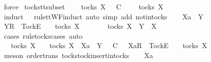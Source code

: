 \begin{isabellebody}
\ force\isanewline
{}\isamarkupfalse%
%
\endisatagproof
{\isafoldproof}%
%
\isadelimproof
\isanewline
%
\endisadelimproof
\isanewline
{}\isamarkupfalse%
\ tocks{\isacharunderscore}tt{\isacharunderscore}subset{}{\isacharcolon}\isanewline
\ \ {\isachardoublequoteopen}{\isasymsigma}\ {\isasymin}\ tocks\ X\ {\isasymLongrightarrow}\ {\isasymrho}\ {\isasymsubseteq}\isactrlsub C\ {\isasymsigma}\ {\isasymLongrightarrow}\ {\isasymrho}\ {\isasymin}\ tocks\ X{\isachardoublequoteclose}\isanewline
%
\isadelimproof
%
\endisadelimproof
%
\isatagproof
{}\isamarkupfalse%
\ {\isacharparenleft}induct\ {\isasymrho}\ {\isasymsigma}\ rule{\isacharcolon}ttWF{}{\isachardot}induct{\isacharcomma}\ auto\ simp\ add{\isacharcolon}\ notin{\isacharunderscore}tocks{\isacharparenright}\isanewline
\ \ \isamarkupfalse%
\ Xa\ {\isasymrho}\ Y\ {\isasymsigma}\isanewline
\ \ \isamarkupfalse%
\ {\isachardoublequoteopen}{\isacharbrackleft}Y{\isacharbrackright}\isactrlsub R\ {\isacharhash}\ {\isacharbrackleft}Tock{\isacharbrackright}\isactrlsub E\ {\isacharhash}\ {\isasymsigma}\ {\isasymin}\ tocks\ X{\isachardoublequoteclose}\isanewline
\ \ \isamarkupfalse%
\ \isamarkupfalse%
\ {\isachardoublequoteopen}{\isasymsigma}\ {\isasymin}\ tocks\ X\ {\isasymand}\ Y\ {\isasymsubseteq}\ X{\isachardoublequoteclose}\isanewline
\ \ \ \ \isamarkupfalse%
\ {\isacharparenleft}cases\ rule{\isacharcolon}tocks{\isachardot}cases{\isacharcomma}\ auto{\isacharparenright}\isanewline
\ \ \isamarkupfalse%
\ \isamarkupfalse%
\ {\isachardoublequoteopen}{\isacharparenleft}{\isasymsigma}\ {\isasymin}\ tocks\ X\ {\isasymLongrightarrow}\ {\isasymrho}\ {\isasymin}\ tocks\ X{\isacharparenright}\ {\isasymLongrightarrow}\ Xa\ {\isasymsubseteq}\ Y\ {\isasymLongrightarrow}\ {\isasymrho}\ {\isasymsubseteq}\isactrlsub C\ {\isasymsigma}\ {\isasymLongrightarrow}\ {\isacharbrackleft}Xa{\isacharbrackright}\isactrlsub R\ {\isacharhash}\ {\isacharbrackleft}Tock{\isacharbrackright}\isactrlsub E\ {\isacharhash}\ {\isasymrho}\ {\isasymin}\ tocks\ X{\isachardoublequoteclose}\isanewline
\ \ \ \ \isamarkupfalse%
\ {\isacharparenleft}meson\ order{\isachardot}trans\ tocks{\isachardot}tock{\isacharunderscore}insert{\isacharunderscore}in{\isacharunderscore}tocks{\isacharparenright}\isanewline
{}\isamarkupfalse%
\isanewline
\ \ \isamarkupfalse%
\ Xa\ {\isasymrho}\ {\isasymsigma}\isanewline
\ \ \isamarkupfalse%

\end{isabellebody}
